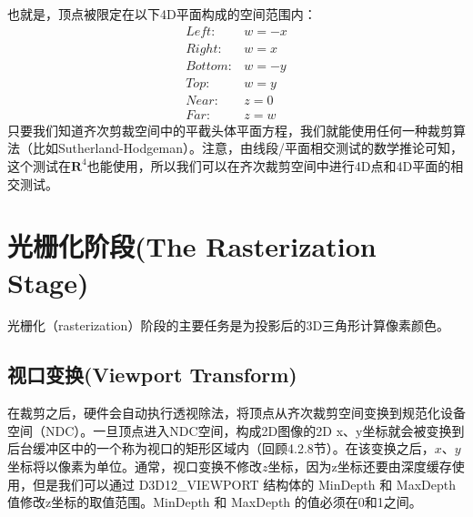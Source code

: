 \begin{flushleft}
也就是，顶点被限定在以下4D平面构成的空间范围内：
\begin{align*}
\mathit{Left:}&w=-x\\
\mathit{Right:}&w=x\\
\mathit{Bottom:}&w=-y\\
\mathit{Top:}&w=y\\
\mathit{Near:}&z=0\\
\mathit{Far:}&z=w
\end{align*}
只要我们知道齐次剪裁空间中的平截头体平面方程，我们就能使用任何一种裁剪算法（比如Sutherland-Hodgeman）。注意，由线段/平面相交测试的数学推论可知，这个测试在$\mathbf{R}^{4}$也能使用，所以我们可以在齐次裁剪空间中进行4D点和4D平面的相交测试。
\end{flushleft}

\section{光栅化阶段(The Rasterization Stage)}
\begin{flushleft}
光栅化（rasterization）阶段的主要任务是为投影后的3D三角形计算像素颜色。
\end{flushleft}
\subsection{视口变换(Viewport Transform)}
\begin{flushleft}
在裁剪之后，硬件会自动执行透视除法，将顶点从齐次裁剪空间变换到规范化设备空间（NDC）。一旦顶点进入NDC空间，构成2D图像的2D x、y坐标就会被变换到后台缓冲区中的一个称为视口的矩形区域内（回顾4.2.8节）。在该变换之后，$x$、$y$坐标将以像素为单位。通常，视口变换不修改$z$坐标，因为z坐标还要由深度缓存使用，但是我们可以通过 D3D12\_VIEWPORT 结构体的 MinDepth 和 MaxDepth 值修改z坐标的取值范围。MinDepth 和 MaxDepth 的值必须在0和1之间。
\end{flushleft}
